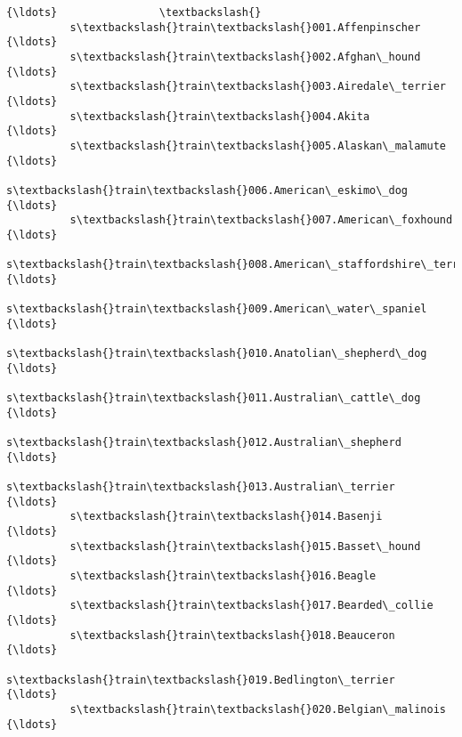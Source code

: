 \documentclass[11pt]{article}
\begin{document}
\begin{Verbatim}[commandchars=\\\{\}]
                                                                      {\ldots}                \textbackslash{}
          s\textbackslash{}train\textbackslash{}001.Affenpinscher                                   {\ldots}                 
          s\textbackslash{}train\textbackslash{}002.Afghan\_hound                                    {\ldots}                 
          s\textbackslash{}train\textbackslash{}003.Airedale\_terrier                                {\ldots}                 
          s\textbackslash{}train\textbackslash{}004.Akita                                           {\ldots}                 
          s\textbackslash{}train\textbackslash{}005.Alaskan\_malamute                                {\ldots}                 
          s\textbackslash{}train\textbackslash{}006.American\_eskimo\_dog                             {\ldots}                 
          s\textbackslash{}train\textbackslash{}007.American\_foxhound                               {\ldots}                 
          s\textbackslash{}train\textbackslash{}008.American\_staffordshire\_terrier                  {\ldots}                 
          s\textbackslash{}train\textbackslash{}009.American\_water\_spaniel                          {\ldots}                 
          s\textbackslash{}train\textbackslash{}010.Anatolian\_shepherd\_dog                          {\ldots}                 
          s\textbackslash{}train\textbackslash{}011.Australian\_cattle\_dog                           {\ldots}                 
          s\textbackslash{}train\textbackslash{}012.Australian\_shepherd                             {\ldots}                 
          s\textbackslash{}train\textbackslash{}013.Australian\_terrier                              {\ldots}                 
          s\textbackslash{}train\textbackslash{}014.Basenji                                         {\ldots}                 
          s\textbackslash{}train\textbackslash{}015.Basset\_hound                                    {\ldots}                 
          s\textbackslash{}train\textbackslash{}016.Beagle                                          {\ldots}                 
          s\textbackslash{}train\textbackslash{}017.Bearded\_collie                                  {\ldots}                 
          s\textbackslash{}train\textbackslash{}018.Beauceron                                       {\ldots}                 
          s\textbackslash{}train\textbackslash{}019.Bedlington\_terrier                              {\ldots}                 
          s\textbackslash{}train\textbackslash{}020.Belgian\_malinois                                {\ldots}                 

\end{Verbatim}
\end{document}
